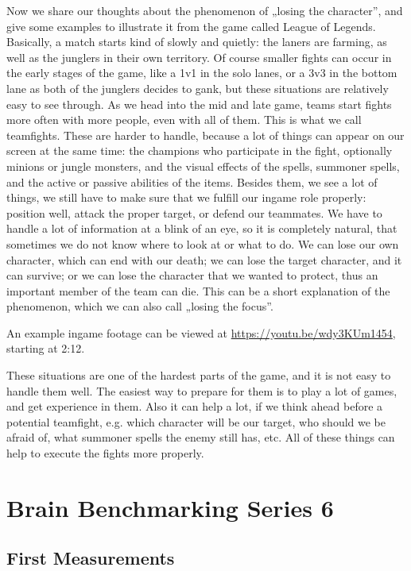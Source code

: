 \documentclass[a4paper]{article}
\begin{document}
Now we share our thoughts about the phenomenon of „losing the character”, and give some examples to illustrate it from the game called League of Legends.
Basically, a match starts kind of slowly and quietly: the laners are farming, as well as the junglers in their own territory. Of course smaller fights can occur in the early stages of the game, like a 1v1 in the solo lanes, or a 3v3 in the bottom lane as both of the junglers decides to gank, but these situations are relatively easy to see through. As we head into the mid and late game, teams start fights more often with more people, even with all of them. This is what we call teamfights. These are harder to handle, 
because a lot of things can appear on our screen at the same time: the champions who participate in the fight, optionally minions or jungle monsters, and the visual effects of the spells, summoner spells, and the active or passive abilities of the items. Besides them, we see a lot of things, we still have to make sure that we fulfill our ingame role properly: position well, attack the proper target, or defend our teammates. We have to handle a lot of information at a blink of an eye, so it is completely natural, that sometimes we do not know where to look at or what to do. We can lose our own character, which can end with our death; we can lose the target character, and it can survive; or we can lose the character that we wanted to protect, thus an important member of the team can die.
This can be a short explanation of the phenomenon, which we can also call „losing the focus”.

An example ingame footage can be viewed at \url{https://youtu.be/wdy3KUm1454}, starting at 2:12.

These situations are one of the hardest parts of the game, and it is not easy to handle them well. The easiest way to prepare for them is to play a lot of games, and get experience in them. Also it can help a lot, if we think ahead before a potential teamfight, e.g. which character will be our target, who should we be afraid of, what summoner spells the enemy still has, etc. All of these things can help to execute the fights more properly.


\section{Brain Benchmarking Series 6}



\subsection{First Measurements}
\end{document}
